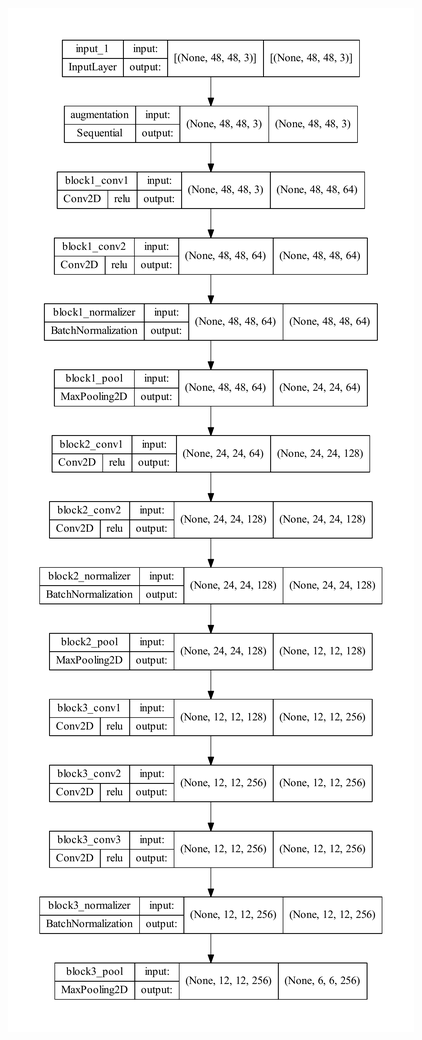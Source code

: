 \documentclass[11pt,a4paper]{article}
\begin{document}
    \begin{figure}[H]
        \centering
        \begin{minipage}[b]{.4\textwidth}
            \centering
            \includegraphics[height = 0.9\textheight]{written_report/pictures/model_1.pdf}

\end{minipage}
\end{figure}
\end{document}
